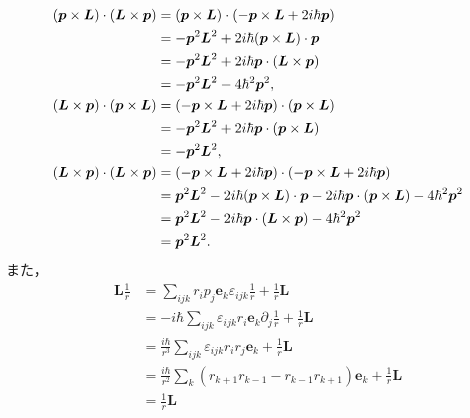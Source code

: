 \begin{align}
  (\boldsymbol{p}\times\boldsymbol{L})\cdot(\boldsymbol{L}\times\boldsymbol{p})
  & = (\boldsymbol{p}\times\boldsymbol{L})\cdot( - \boldsymbol{p}\times\boldsymbol{L} + 2i\hbar\boldsymbol{p})\notag\\
  & = - \boldsymbol{p}^2\boldsymbol{L}^2 + 2i\hbar(\boldsymbol{p}\times\boldsymbol{L})\cdot\boldsymbol{p}\notag\\
  & = - \boldsymbol{p}^2\boldsymbol{L}^2 + 2i\hbar\boldsymbol{p}\cdot(\boldsymbol{L}\times\boldsymbol{p})\notag\\
  & = - \boldsymbol{p}^2\boldsymbol{L}^2 - 4\hbar^2\boldsymbol{p}^2,\label{pxLLxp}\\
  (\boldsymbol{L}\times\boldsymbol{p})\cdot(\boldsymbol{p}\times\boldsymbol{L})
  & = ( - \boldsymbol{p}\times\boldsymbol{L} + 2i\hbar\boldsymbol{p})\cdot(\boldsymbol{p}\times\boldsymbol{L})\notag\\
  & = - \boldsymbol{p}^2\boldsymbol{L}^2 + 2i\hbar\boldsymbol{p}\cdot(\boldsymbol{p}\times\boldsymbol{L})\notag\\
  & = - \boldsymbol{p}^2\boldsymbol{L}^2,\label{LxppxL}\\
  (\boldsymbol{L}\times\boldsymbol{p})\cdot(\boldsymbol{L}\times\boldsymbol{p})
  & = ( - \boldsymbol{p}\times\boldsymbol{L} + 2i\hbar\boldsymbol{p})\cdot( - \boldsymbol{p}\times\boldsymbol{L} + 2i\hbar\boldsymbol{p})\notag\\
  & = \boldsymbol{p}^2\boldsymbol{L}^2 - 2i\hbar(\boldsymbol{p}\times\boldsymbol{L})\cdot\boldsymbol{p} - 2i\hbar\boldsymbol{p}\cdot(\boldsymbol{p}\times\boldsymbol{L}) - 4\hbar^2\boldsymbol{p}^2\notag\\
  & = \boldsymbol{p}^2\boldsymbol{L}^2 - 2i\hbar\boldsymbol{p}\cdot(\boldsymbol{L}\times\boldsymbol{p}) - 4\hbar^2\boldsymbol{p}^2\notag\\
  & = \boldsymbol{p}^2\boldsymbol{L}^2.\label{LxpLxp}
\end{align}
また，
\begin{align*}
  \boldsymbol{L}\frac{1}{r} & = \sum_{ijk}r_ip_j\boldsymbol{e}_k\varepsilon_{ijk}\frac{1}{r} + \frac{1}{r}\boldsymbol{L}\\
  & = - i\hbar\sum_{ijk}\varepsilon_{ijk}r_i\boldsymbol{e}_k\partial_j\frac{1}{r} + \frac{1}{r}\boldsymbol{L}\\
  & = \frac{i\hbar}{r^3}\sum_{ijk}\varepsilon_{ijk}r_ir_j\boldsymbol{e}_k + \frac{1}{r}\boldsymbol{L}\\
  & = \frac{i\hbar}{r^2}\sum_k(r_{k + 1}r_{k - 1} - r_{k - 1}r_{k + 1})\boldsymbol{e}_k + \frac{1}{r}\boldsymbol{L}\\
  & = \frac{1}{r}\boldsymbol{L}
\end{align*}
